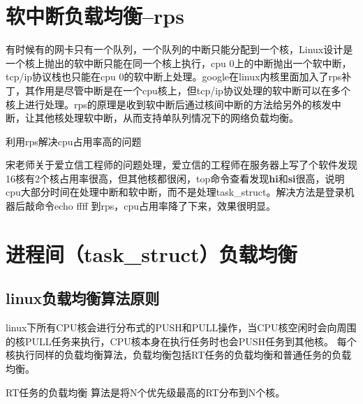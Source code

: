 \section{软中断负载均衡--rps}
有时候有的网卡只有一个队列，一个队列的中断只能分配到一个核，Linux设计是一个核上抛出的软中断只能在同一个核上执行，cpu 0上的中断抛出一个软中断，tcp/ip协议栈也只能在cpu 0的软中断上处理。google在linux内核里面加入了rps补丁，其作用是尽管中断是在一个cpu核上，但tcp/ip协议处理的软中断可以在多个核上进行处理。rps的原理是收到软中断后通过核间中断的方法给另外的核发中断，让其他核处理软中断，从而支持单队列情况下的网络负载均衡。
\clearpage
\begin{example*}
  \wdexpbox
  {\caption{利用rps解决cpu占用率高的问题}}
  {宋老师关于爱立信工程师的问题处理，爱立信的工程师在服务器上写了个软件发现16核有2个核占用率很高，但其他核都很闲，top命令查看发现\textbf{hi}和\textbf{si}很高，说明cpu大部分时间在处理中断和软中断，而不是处理task\_struct。解决方法是登录机器后敲命令echo ffff 到rps，cpu占用率降了下来，效果很明显。}
\end{example*}

\section{进程间（task\_struct）负载均衡}
\subsection{linux负载均衡算法原则}
linux下所有CPU核会进行分布式的PUSH和PULL操作，当CPU核空闲时会向周围的核PULL任务来执行，CPU核本身在执行任务时也会PUSH任务到其他核。
每个核执行同样的负载均衡算法，负载均衡包括RT任务的负载均衡和普通任务的负载均衡。

RT任务的负载均衡 算法是将N个优先级最高的RT分布到N个核。

